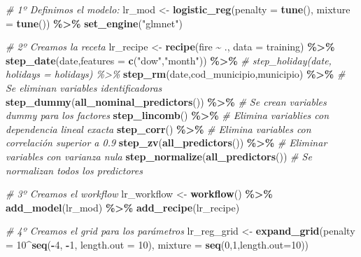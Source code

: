 \documentclass[12pt,a4paper,]{book}
\newenvironment{Shaded}{\begin{snugshade}}{\end{snugshade}}
\newcommand{\AttributeTok}[1]{\textcolor[rgb]{0.13,0.29,0.53}{#1}}
\newcommand{\CommentTok}[1]{\textcolor[rgb]{0.56,0.35,0.01}{\textit{#1}}}
\newcommand{\DecValTok}[1]{\textcolor[rgb]{0.00,0.00,0.81}{#1}}
\newcommand{\FunctionTok}[1]{\textcolor[rgb]{0.13,0.29,0.53}{\textbf{#1}}}
\newcommand{\NormalTok}[1]{#1}
\newcommand{\OtherTok}[1]{\textcolor[rgb]{0.56,0.35,0.01}{#1}}
\newcommand{\SpecialCharTok}[1]{\textcolor[rgb]{0.81,0.36,0.00}{\textbf{#1}}}
\newcommand{\StringTok}[1]{\textcolor[rgb]{0.31,0.60,0.02}{#1}}
\newcounter{dummy}
\numberwithin{dummy}{section}
\theoremstyle{ocrenumbox}
\theoremstyle{blacknumex}
\theoremstyle{blacknumbox}
\theoremstyle{ocrenum}
\theoremstyle{ocrenum}
\begin{document}
\begin{Shaded}
\begin{Highlighting}[]
\CommentTok{\# 1º Definimos el modelo:}
\NormalTok{lr\_mod }\OtherTok{\textless{}{-}} 
  \FunctionTok{logistic\_reg}\NormalTok{(}\AttributeTok{penalty =} \FunctionTok{tune}\NormalTok{(), }\AttributeTok{mixture =} \FunctionTok{tune}\NormalTok{()) }\SpecialCharTok{\%\textgreater{}\%} 
  \FunctionTok{set\_engine}\NormalTok{(}\StringTok{"glmnet"}\NormalTok{)}

\CommentTok{\# 2º Creamos la receta}
\NormalTok{lr\_recipe }\OtherTok{\textless{}{-}} 
  \FunctionTok{recipe}\NormalTok{(fire }\SpecialCharTok{\textasciitilde{}}\NormalTok{ ., }\AttributeTok{data =}\NormalTok{ training) }\SpecialCharTok{\%\textgreater{}\%} 
  \FunctionTok{step\_date}\NormalTok{(date,}\AttributeTok{features =} \FunctionTok{c}\NormalTok{(}\StringTok{"dow"}\NormalTok{,}\StringTok{"month"}\NormalTok{)) }\SpecialCharTok{\%\textgreater{}\%} 
  \CommentTok{\# step\_holiday(date, holidays = holidays) \%\textgreater{}\% }
  \FunctionTok{step\_rm}\NormalTok{(date,cod\_municipio,municipio) }\SpecialCharTok{\%\textgreater{}\%} \CommentTok{\# Se eliminan variables identificadoras}
  \FunctionTok{step\_dummy}\NormalTok{(}\FunctionTok{all\_nominal\_predictors}\NormalTok{()) }\SpecialCharTok{\%\textgreater{}\%} \CommentTok{\# Se crean variables dummy para los factores}
  \FunctionTok{step\_lincomb}\NormalTok{() }\SpecialCharTok{\%\textgreater{}\%} \CommentTok{\# Elimina variablies con dependencia lineal exacta}
  \FunctionTok{step\_corr}\NormalTok{() }\SpecialCharTok{\%\textgreater{}\%} \CommentTok{\# Elimina variables con correlación superior a 0.9}
  \FunctionTok{step\_zv}\NormalTok{(}\FunctionTok{all\_predictors}\NormalTok{()) }\SpecialCharTok{\%\textgreater{}\%} \CommentTok{\# Eliminar variables con varianza nula}
  \FunctionTok{step\_normalize}\NormalTok{(}\FunctionTok{all\_predictors}\NormalTok{()) }\CommentTok{\# Se normalizan todos los predictores}

\CommentTok{\# 3º Creamos el workflow}
\NormalTok{lr\_workflow }\OtherTok{\textless{}{-}} 
  \FunctionTok{workflow}\NormalTok{() }\SpecialCharTok{\%\textgreater{}\%} 
  \FunctionTok{add\_model}\NormalTok{(lr\_mod) }\SpecialCharTok{\%\textgreater{}\%} 
  \FunctionTok{add\_recipe}\NormalTok{(lr\_recipe)}

\CommentTok{\# 4º Creamos el grid para los parámetros}
\NormalTok{lr\_reg\_grid }\OtherTok{\textless{}{-}} \FunctionTok{expand\_grid}\NormalTok{(}\AttributeTok{penalty =} \DecValTok{10}\SpecialCharTok{\^{}}\FunctionTok{seq}\NormalTok{(}\SpecialCharTok{{-}}\DecValTok{4}\NormalTok{, }\SpecialCharTok{{-}}\DecValTok{1}\NormalTok{, }\AttributeTok{length.out =} \DecValTok{10}\NormalTok{),}
                           \AttributeTok{mixture =} \FunctionTok{seq}\NormalTok{(}\DecValTok{0}\NormalTok{,}\DecValTok{1}\NormalTok{,}\AttributeTok{length.out=}\DecValTok{10}\NormalTok{))}


\end{Highlighting}
\end{Shaded}
\end{document}
